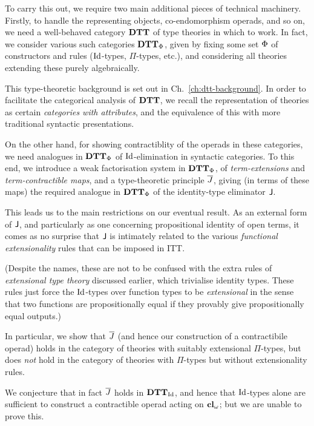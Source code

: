 \begin{para}
To carry this out, we require two main additional pieces of technical machinery.  Firstly, to handle the representing objects, co-endomorphism operads, and so on, we need a well-behaved category $\mathbf{DTT}$ of type theories in which to work.  In fact, we consider various such categories $\mathbf{DTT}_{\Phi}$, given by fixing some set ${\Phi}$ of constructors and rules ($\mathrm{Id}$-types, $\Pi$-types, etc.), and considering all theories extending these purely algebraically.

This type-theoretic background is set out in Ch.~\ref{ch:dtt-background}.  In order to facilitate the categorical analysis of $\mathbf{DTT}$, we recall the representation of theories as certain \emph{categories with attributes}, and the equivalence of this with more traditional syntactic presentations.

On the other hand, for showing contractiblity of the operads in these categories, we need analogues in $\mathbf{DTT}_{\Phi}$ of $\mathrm{Id}$-elimination in syntactic categories.  To this end, we introduce a weak factorisation system in $\mathbf{DTT}_{\Phi}$, of \emph{term-extensions} and \emph{term-contractible maps}, and a type-theoretic principle $\overline{J}$, giving (in terms of these maps) the required analogue in $\mathbf{DTT}_{\Phi}$ of the identity-type eliminator $\mathsf{J}$.
\end{para}

\begin{para}
This leads us to the main restrictions on our eventual result.  As an external form of $\mathsf{J}$, and particularly as one concerning propositional identity of open terms, it comes as no surprise that $\mathsf{J}$ is intimately related to the various \emph{functional extensionality} rules that can be imposed in ITT.

(Despite the names, these are not to be confused with the extra rules of \emph{extensional type theory} discussed earlier, which trivialise identity types.  These rules just force the $\mathrm{Id}$-types over function types to be \emph{extensional} in the sense that two functions are propositionally equal if they provably give propositionally equal outputs.)

In particular, we show that $\overline{J}$ (and hence our construction of a contractibile operad) holds in the category of theories with suitably extensional $\Pi$-types, but does \emph{not} hold in the category of theories with $\Pi$-types but without extensionality rules.  

We conjecture that in fact $\overline{J}$ holds in $\mathbf{DTT}_{\mathrm{Id}}$, and hence that $\mathrm{Id}$-types alone are sufficient to construct a contractible operad acting on $\mathbf{cl}_\omega$; but we are unable to prove this.
\end{para}

